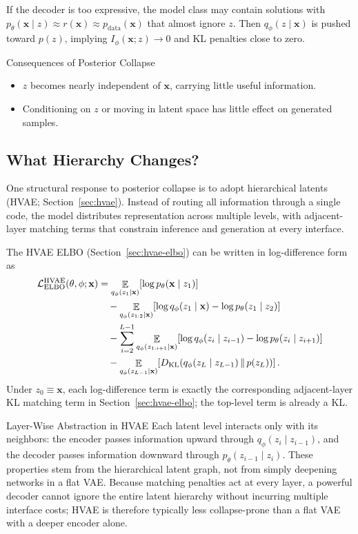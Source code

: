 \documentclass[11pt,a4paper]{article}
\DeclareMathOperator*{\E}{\mathbb{E}}
\newcommand{\bx}{\mathbf{x}} \newcommand{\by}{\mathbf{y}}
\newcommand{\KL}[2]{D_{\mathrm{KL}}\!\left(#1\,\|\,#2\right)}
\newcommand{\elboHVAE}{\cL_{\mathrm{ELBO}}^{\mathrm{HVAE}}}
\newcommand{\pdata}{p_{\mathrm{data}}}
\begin{document}
If the decoder is too expressive, the model class may contain solutions with
$p_\theta(\bx\mid z)\approx r(\bx)\approx \pdata(\bx)$ that almost ignore $z$. Then $q_\phi(z\mid \bx)$ is pushed toward $p(z)$, implying $I_\phi(\bx;z)\to 0$ and KL penalties close to zero.

\begin{remark}{Consequences of Posterior Collapse}{}
\begin{itemize}[leftmargin=1.2em, itemsep=2pt]
    \item $z$ becomes nearly independent of $\bx$, carrying little useful information.
    \item Conditioning on $z$ or moving in latent space has little effect on generated samples.
\end{itemize}
\end{remark}

\subsection{What Hierarchy Changes?}

One structural response to posterior collapse is to adopt hierarchical latents (HVAE; Section~\ref{sec:hvae}). Instead of routing all information through a single code, the model distributes representation across multiple levels, with adjacent-layer matching terms that constrain inference and generation at every interface.

The HVAE ELBO (Section~\ref{sec:hvae-elbo}) can be written in log-difference form as
\begin{align*}
    \elboHVAE(\theta,\phi;\bx)
    &= \E_{q_\phi(z_1\mid \bx)}\!\left[\log p_\theta(\bx\mid z_1)\right] \\
    &\quad - \E_{q_\phi(z_{1:2}\mid \bx)}
       \!\left[\log q_\phi(z_1\mid \bx) - \log p_\theta(z_1\mid z_2)\right] \\
    &\quad - \sum_{i=2}^{L-1}
       \E_{q_\phi(z_{1:i+1}\mid \bx)}
       \!\left[\log q_\phi(z_i\mid z_{i-1}) - \log p_\theta(z_i\mid z_{i+1})\right] \\
    &\quad - \E_{q_\phi(z_{L-1}\mid \bx)}
       \!\left[\KL{q_\phi(z_L\mid z_{L-1})}{p(z_L)}\right].
\end{align*}
Under $z_0\equiv\bx$, each log-difference term is exactly the corresponding adjacent-layer KL matching term in Section~\ref{sec:hvae-elbo}; the top-level term is already a KL.

\begin{remark}{Layer-Wise Abstraction in HVAE}{}
Each latent level interacts only with its neighbors: the encoder passes information upward through $q_\phi(z_i\mid z_{i-1})$, and the decoder passes information downward through $p_\theta(z_{i-1}\mid z_i)$. These properties stem from the hierarchical latent graph, not from simply deepening networks in a flat VAE. Because matching penalties act at every layer, a powerful decoder cannot ignore the entire latent hierarchy without incurring multiple interface costs; HVAE is therefore typically less collapse-prone than a flat VAE with a deeper encoder alone.
\end{remark}
\end{document}
